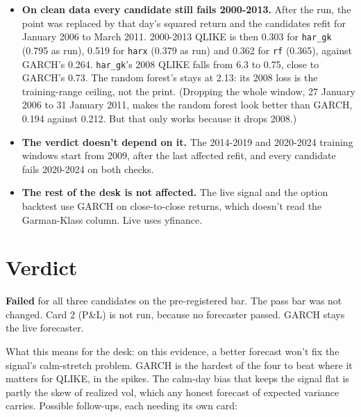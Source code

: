 \documentclass{article}
\begin{document}
\begin{itemize}
\begin{itemize}
\item \textbf{On clean data every candidate still fails 2000-2013.} After the run, the point was replaced by that day's squared return and the candidates refit for January 2006 to March 2011. 2000-2013 QLIKE is then 0.303 for \texttt{har\_\allowbreak{}gk} (0.795 as run), 0.519 for \texttt{harx} (0.379 as run) and 0.362 for \texttt{rf} (0.365), against GARCH's 0.264. \texttt{har\_\allowbreak{}gk}'s 2008 QLIKE falls from 6.3 to 0.75, close to GARCH's 0.73. The random forest's stays at 2.13: its 2008 loss is the training-range ceiling, not the print. (Dropping the whole window, 27 January 2006 to 31 January 2011, makes the random forest look better than GARCH, 0.194 against 0.212. But that only works because it drops 2008.)

\item \textbf{The verdict doesn't depend on it.} The 2014-2019 and 2020-2024 training windows start from 2009, after the last affected refit, and every candidate fails 2020-2024 on both checks.

\item \textbf{The rest of the desk is not affected.} The live signal and the option backtest use GARCH on close-to-close returns, which doesn't read the Garman-Klass column. Live uses yfinance.

\end{itemize}

\end{itemize}

\section{Verdict}

\textbf{Failed} for all three candidates on the pre-registered bar. The pass bar was not changed. Card 2 (P\&L) is not run, because no forecaster passed. GARCH stays the live forecaster.

What this means for the desk: on this evidence, a better forecast won't fix the signal's calm-stretch problem. GARCH is the hardest of the four to beat where it matters for QLIKE, in the spikes. The calm-day bias that keeps the signal flat is partly the skew of realized vol, which any honest forecast of expected variance carries. Possible follow-ups, each needing its own card:
\end{document}
